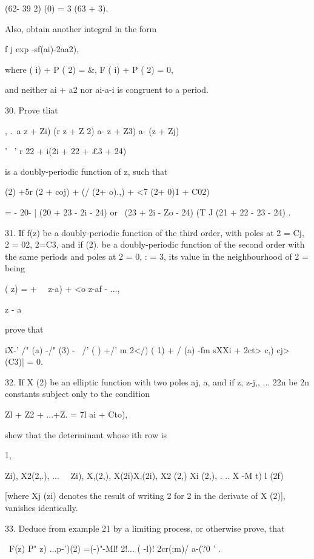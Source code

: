 {(62- 39 2) (0) = 3 (63 + 3).

Also, obtain another integral in the form

 f j exp -sf(ai)-2aa2),

where ( i) + P ( 2) = \&, F ( i) + P ( 2) = 0,

and neither ai + a2 nor ai-a-i is congruent to a period.

%
%

30. Prove tliat

, .\ a z + Zi) (r z + Z 2) a- z + Z3) a- (z + Zj)

  '~ ' r 22 + i(2i + 22 + £3 + 24)

is a doubly-periodic function of z, such that

  (2) +5r (2 + coj) + (/ (2+ o).,) + <7 (2+ 0)1 + C02)

= - 20- | (20 + 23 - 2i - 24) or \ (23 + 2i - Zo - 24) (T J (21 + 22 -
23 - 24) .


31. If f(z) be a doubly-periodic function of the third order, with
poles at 2 = Cj, 2 = 02, 2=C3, and if (2). be a doubly-periodic
function of the second order with the same periods and poles at 2 = 0,
: = 3, its value in the neighbourhood of 2 = being

( z) = + \ \ z-a) + <o z-af - ...,

z - a

prove that

iX-' /" (a) -/" (3) - \ /' ( ) +/' m 2</) ( 1) + / (a) -fm sXXi + 2ct>
c,) cj> (C3)| = 0.


32. If X (2) be an elliptic function with two poles aj, a, and if z,
z-j,, ... 22n be 2n constants subject only to the condition

Zl + Z2 + ...+Z. = 7l ai + Cto),

shew that the determinant whose ith row is

1, \ \ {Zi), X2(2,.), ... \ \ Zi), X,(2,), X(2i)X,(2i), X2 (2,) Xi
(2,), . .. X -M t) l (2f)

[where Xj (zi) denotes the result of writing 2 for 2 in the derivate
of X (2)], vanishes identically. 

33. Deduce from example 21 by a limiting process, or otherwise prove,
that

\ F(z) P" z) ...p-')(2) =(-)"-Ml! 2!... ( -l)! 2cr(;m)/ a-(?0 ' .

}}
